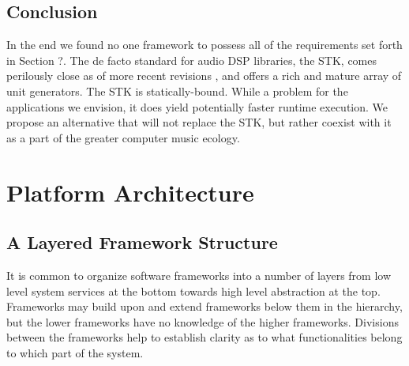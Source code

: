 \documentclass[twoside,10pt]{article}
\begin{document}


\subsection{Conclusion} %

In the end we found no one framework to possess all of the requirements set forth in Section ?.  The de facto standard for audio DSP libraries, the STK, comes perilously close as of more recent revisions \cite{Scavone:2005}, and offers a rich and mature array of unit generators.  The STK is statically-bound.  While a problem for the applications we envision, it does yield potentially faster runtime execution.  We propose an alternative that will not replace the STK, but rather coexist with it as a part of the greater computer music ecology.

%
%






\section{Platform Architecture} %

\subsection{A Layered Framework Structure}

It is common to organize software frameworks into a number of layers from low level system services at the bottom towards high level abstraction at the top.  Frameworks may build upon and extend frameworks below them in the hierarchy, but the lower frameworks have no knowledge of the higher frameworks. Divisions between the frameworks help to establish clarity as to what functionalities belong to which part of the system. 
\end{document}
